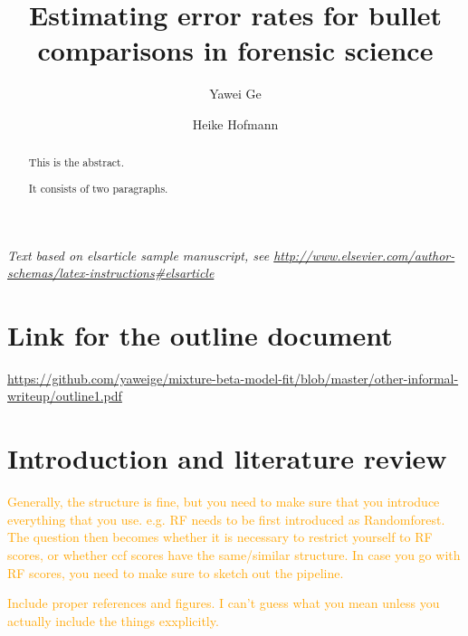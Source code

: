\documentclass[]{elsarticle} %
\begin{document}
\begin{frontmatter}

  \title{Estimating error rates for bullet comparisons in forensic science}
    \author[Iowa State University]{Yawei Ge}
    \author[Iowa State University]{Heike Hofmann}
      \address[Some Institute of Technology]{Department, Street, City, State, Zip}
    \address[Another University]{Department, Street, City, State, Zip}
    
  \begin{abstract}
  This is the abstract.
  
  It consists of two paragraphs.
  \end{abstract}
  
 \end{frontmatter}

\newcommand{\hh}[1]{{\textcolor{orange}{#1}}}
\newcommand{\yg}[1]{{\textcolor{blue}{#1}}}

\emph{Text based on elsarticle sample manuscript, see
\url{http://www.elsevier.com/author-schemas/latex-instructions\#elsarticle}}

\hypertarget{link-for-the-outline-document}{%
\section{Link for the outline
document}\label{link-for-the-outline-document}}

\url{https://github.com/yaweige/mixture-beta-model-fit/blob/master/other-informal-writeup/outline1.pdf}

\hypertarget{introduction-and-literature-review}{%
\section{Introduction and literature
review}\label{introduction-and-literature-review}}

{\textcolor{orange}{Generally, the structure is fine, but you need to make sure that you introduce everything that you use. e.g. RF needs to be first introduced as Randomforest. The question then becomes whether it is necessary to restrict yourself to RF scores, or whether ccf scores have the same/similar structure. In case you go with RF scores, you need to make sure to sketch out the pipeline. }}

{\textcolor{orange}{Include proper references and figures. I can't guess what you mean unless you actually include the things exxplicitly.}}
\end{document}
